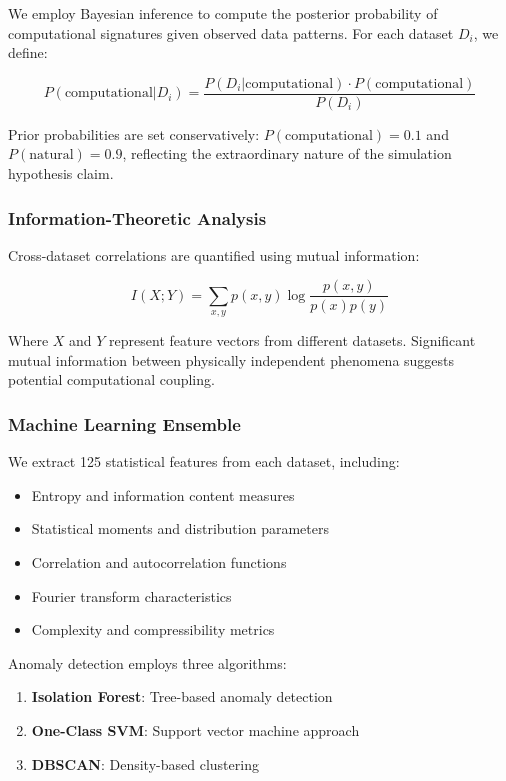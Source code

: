 \documentclass[12pt,a4paper]{article}
\begin{document}
We employ Bayesian inference to compute the posterior probability of computational signatures given observed data patterns. For each dataset $D_i$, we define:

\begin{equation}
P(\text{computational}|D_i) = \frac{P(D_i|\text{computational}) \cdot P(\text{computational})}{P(D_i)}
\end{equation}

Prior probabilities are set conservatively: $P(\text{computational}) = 0.1$ and $P(\text{natural}) = 0.9$, reflecting the extraordinary nature of the simulation hypothesis claim.

\subsubsection{Information-Theoretic Analysis}

Cross-dataset correlations are quantified using mutual information:

\begin{equation}
I(X;Y) = \sum_{x,y} p(x,y) \log \frac{p(x,y)}{p(x)p(y)}
\end{equation}

Where $X$ and $Y$ represent feature vectors from different datasets. Significant mutual information between physically independent phenomena suggests potential computational coupling.

\subsubsection{Machine Learning Ensemble}

We extract 125 statistical features from each dataset, including:
\begin{itemize}
\item Entropy and information content measures
\item Statistical moments and distribution parameters  
\item Correlation and autocorrelation functions
\item Fourier transform characteristics
\item Complexity and compressibility metrics
\end{itemize}

Anomaly detection employs three algorithms:
\begin{enumerate}
\item \textbf{Isolation Forest}: Tree-based anomaly detection
\item \textbf{One-Class SVM}: Support vector machine approach
\item \textbf{DBSCAN}: Density-based clustering
\end{enumerate}
\end{document}
